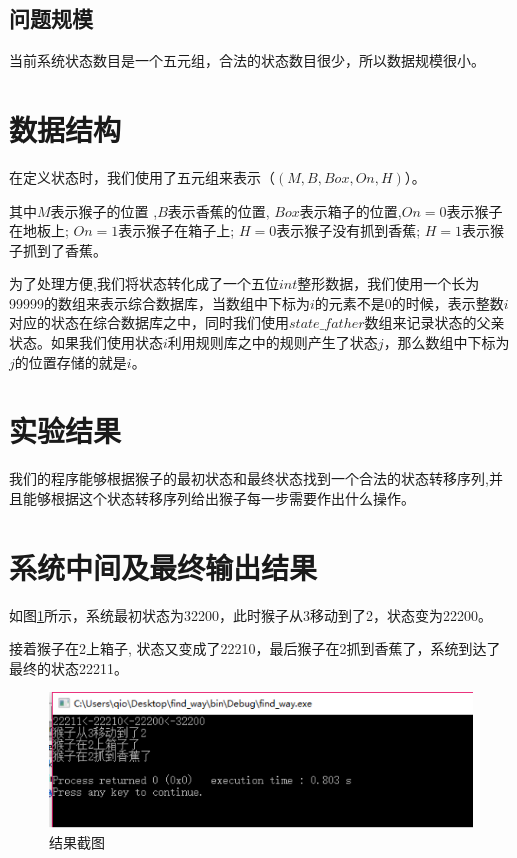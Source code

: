 \documentclass[forprint]{WHUBachelor}
\begin{document}
\subsection{问题规模}

当前系统状态数目是一个五元组，合法的状态数目很少，所以数据规模很小。

\section{数据结构}

在定义状态时，我们使用了五元组来表示（$(M, B, Box, On, H)$）。

其中$M$表示猴子的位置 ,$B$表示香蕉的位置, $Box$表示箱子的位置,$On=0$表示猴子在地板上; $On=1$表示猴子在箱子上; $H=0$表示猴子没有抓到香蕉;  $H=1$表示猴子抓到了香蕉。

为了处理方便,我们将状态转化成了一个五位$int$整形数据，我们使用一个长为99999的数组来表示综合数据库，当数组中下标为$i$的元素不是0的时候，表示整数$i$对应的状态在综合数据库之中，同时我们使用$state\_father$数组来记录状态的父亲状态。如果我们使用状态$i$利用规则库之中的规则产生了状态$j$，那么数组中下标为$j$的位置存储的就是$i$。

\section{实验结果}

我们的程序能够根据猴子的最初状态和最终状态找到一个合法的状态转移序列,并且能够根据这个状态转移序列给出猴子每一步需要作出什么操作。

\section{系统中间及最终输出结果}

如图\ref{fig:result}所示，系统最初状态为32200，此时猴子从3移动到了2，状态变为22200。

接着猴子在2上箱子, 状态又变成了22210，最后猴子在2抓到香蕉了，系统到达了最终的状态22211。

\begin{figure}[H]
  \centering
  \includegraphics[width=6in]{figures/result.png}
  \caption{结果截图}\label{fig:result}
\end{figure}
\end{document}
